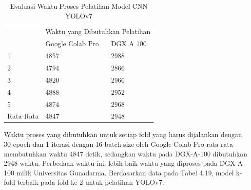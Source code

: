 \begin{singlespace}
	\begin{table}[H]
		\centering
		\caption{Evaluasi Waktu Proses Pelatihan Model CNN YOLOv7}
		\label{tbl:Evaluasi-Waktu-Proses-Pelatihan-Model-CNN-YOLOv7}
		\begin{tabular}{|m{2cm}|m{5cm}m{5cm}|}
			\hline
			\rowcolor[HTML]{D9D9D9} 
			\cellcolor[HTML]{D9D9D9}                       & \multicolumn{2}{l|}{\cellcolor[HTML]{D9D9D9}Waktu yang Dibutuhkan Pelatihan} \\ \cline{2-3} 
			\rowcolor[HTML]{D9D9D9} 
			\multirow{-2}{*}{\cellcolor[HTML]{D9D9D9}Fold} & \multicolumn{1}{l|}{\cellcolor[HTML]{D9D9D9}Google Colab Pro}   & DGX A 100  \\ \hline
			1                                              & \multicolumn{1}{l|}{4857}                                       & 2988        \\ \hline
			2                                              & \multicolumn{1}{l|}{4794}                                       & 2866        \\ \hline
			3                                              & \multicolumn{1}{l|}{4820}                                       & 2966        \\ \hline
			4                                              & \multicolumn{1}{l|}{4888}                                       & 2952        \\ \hline
			5                                              & \multicolumn{1}{l|}{4874}                                       & 2968        \\ \hline
			Rata-Rata                                      & \multicolumn{1}{l|}{4847}                                       & 2948        \\ \hline
		\end{tabular}
	\end{table}
\end{singlespace}

Waktu proses yang dibutuhkan untuk setiap fold yang harus dijalankan dengan 30 epoch dan 1 iterasi dengan 16 batch size oleh Google Colab Pro rata-rata membutuhkan waktu 4847 detik, sedangkan waktu pada DGX-A-100 dibutuhkan 2948 waktu. Perbedaan waktu ini, lebih baik waktu yang diproses pada DGX-A-100 milik Universitas Gunadarma. Berdasarkan data pada Tabel 4.19, model k-fold terbaik pada fold ke 2 untuk pelatihan YOLOv7. 

